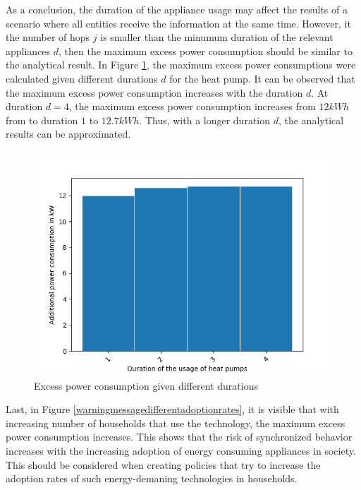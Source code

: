 As a conclusion, the duration of the appliance 
usage may affect the results of a scenario where 
all entities receive the information at the same time.
However, it the number of hops $j$ is smaller than
the minumum duration of the relevant appliances $d$,
then the maximum excess power consumption should 
be similar to the analytical result. 
In Figure \ref{warningmessagedifferentdurations},
the maximum excess power consumptions were calculated
given different durations $d$ for the heat pump.
It can be observed that the maximum excess power 
consumption increases with the duration $d$.
At duration $d=4$, the maximum excess power consumption
increases from $12kWh$ from to duration $1$ to 
$12.7kWh$. Thus, with a longer duration $d$, the 
analytical results can be approximated.

\begin{figure}[!ht]
    \center
    \includegraphics[scale=.7]{figs/eval/scenario4/durationeval.png}
    \caption{Excess power consumption given different durations}
    \label{warningmessagedifferentdurations}
\end{figure}

Last, in Figure \ref{warningmessagedifferentadoptionrates},
it is visible that with increasing number of households 
that use the technology, the maximum excess power consumption
increases. This shows that the risk of synchronized 
behavior increases with the increasing adoption of 
energy consuming appliances in society. This should 
be considered when creating policies that try to 
increase the adoption rates of such energy-demaning 
technologies in households.

